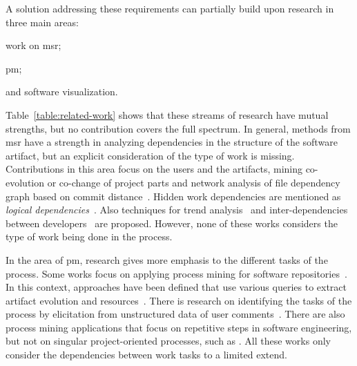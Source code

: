 A solution addressing these requirements can partially build upon research in three main areas:
\begin{inparaenum}[\itshape i)]
	\item work on \gls{msr};
	\item \gls{pm};
	\item and software visualization.
\end{inparaenum}



Table~\ref{table:related-work} shows that these streams of research have mutual strengths, but no contribution covers the full spectrum. In general, methods from \gls{msr} have a strength in analyzing dependencies in the structure of the software artifact, but an explicit consideration of the type of work is missing. Contributions in this area focus on the users and the artifacts, mining co-evolution or co-change of project parts \citep{DBLP:conf/icst/ZaidmanRDD08,DAmbros2009} and network analysis of file dependency graph based on commit distance~\citep{Zimmermann2008,Abate2009,Weicheng2013}. Hidden work dependencies are mentioned as \emph{logical dependencies}~\citep{Oliva2011}. Also techniques for trend analysis~\citep{Ruohonen2015} and inter-dependencies between developers~\citep{Lindberg2016} are proposed. However, none of these works considers the type of work being done in the process.

In the area of \gls{pm}, research gives more emphasis to the different tasks of the process. Some works focus on applying process mining for software repositories~\citep{Poncin2011a,Mittal2014,DBLP:conf/bpm/BalaCMRP15}. In this context, approaches have been defined that use various queries to extract artifact evolution and resources~\citep{Beheshti2016,Beheshti2013}. There is research on identifying the tasks of the process by elicitation from unstructured data of user comments~\citep{Goncalves2011}. There are also process mining applications that focus on repetitive steps in software engineering, but not on singular project-oriented processes, such as \citep{DBLP:conf/se/KindlerRS06}. All these works only consider the dependencies between work tasks to a limited extend.


